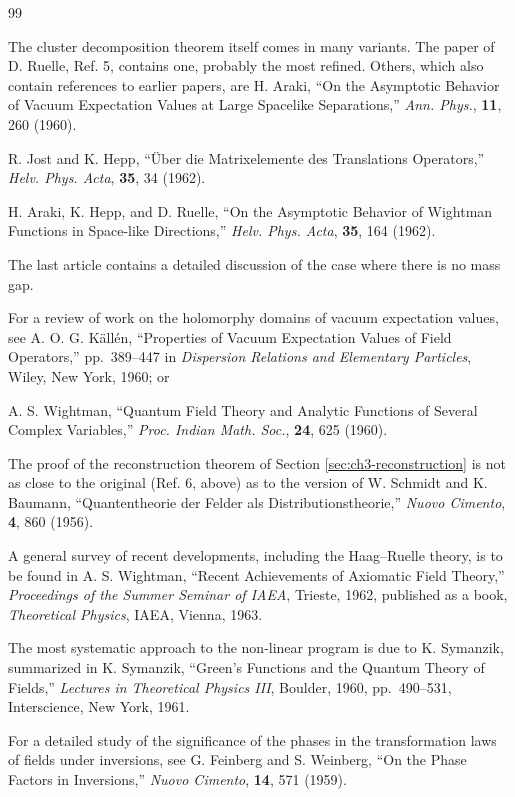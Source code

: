 \begin{thebibliography}{99}
\item[]
The cluster decomposition theorem itself comes in many variants.  The paper
of D. Ruelle, Ref. 5, contains one, probably the most refined.  Others,
which also contain references to earlier papers, are
 H. Araki, ``On the Asymptotic Behavior of Vacuum Expectation
Values at Large Spacelike Separations,'' \emph{Ann. Phys.}, \textbf{11}, 260
(1960).

 R. Jost and K. Hepp, ``Über die Matrixelemente des Translations
Operators,'' \emph{Helv. Phys. Acta}, \textbf{35}, 34 (1962).

 H. Araki, K. Hepp, and D. Ruelle, ``On the Asymptotic Behavior of
Wightman Functions in Space-like Directions,'' \emph{Helv. Phys. Acta},
\textbf{35}, 164 (1962).

\item[]
The last article contains a detailed discussion of the case where there is
no mass gap.

\item[]
For a review of work on the holomorphy domains of vacuum expectation values,
see
 A. O. G. Källén, ``Properties of Vacuum Expectation Values of
Field Operators,'' pp.~389--447 in \emph{Dispersion Relations and Elementary
Particles}, Wiley, New York, 1960; or

 A. S. Wightman, ``Quantum Field Theory and Analytic Functions of
Several Complex Variables,'' \emph{Proc. Indian Math. Soc.}, \textbf{24}, 625
(1960).

\item[]
The proof of the reconstruction theorem of Section \ref{sec:ch3-reconstruction} is not as close to
the original (Ref. 6, above) as to the version of
 W. Schmidt and K. Baumann, ``Quantentheorie der Felder als
Distributionstheorie,'' \emph{Nuovo Cimento}, \textbf{4}, 860 (1956).

\item[]
A general survey of recent developments, including the Haag--Ruelle theory,
is to be found in
 A. S. Wightman, ``Recent Achievements of Axiomatic Field Theory,''
\emph{Proceedings of the Summer Seminar of IAEA}, Trieste, 1962, published as
a book, \emph{Theoretical Physics}, IAEA, Vienna, 1963.

\item[]
The most systematic approach to the non-linear program is due to K. Symanzik,
summarized in
 K. Symanzik, ``Green's Functions and the Quantum Theory of Fields,''
\emph{Lectures in Theoretical Physics III}, Boulder, 1960, pp.~490--531,
Interscience, New York, 1961.

\item[]
For a detailed study of the significance of the phases in the transformation
laws of fields under inversions, see
 G. Feinberg and S. Weinberg, ``On the Phase Factors in Inversions,''
\emph{Nuovo Cimento}, \textbf{14}, 571 (1959).

\end{thebibliography}
